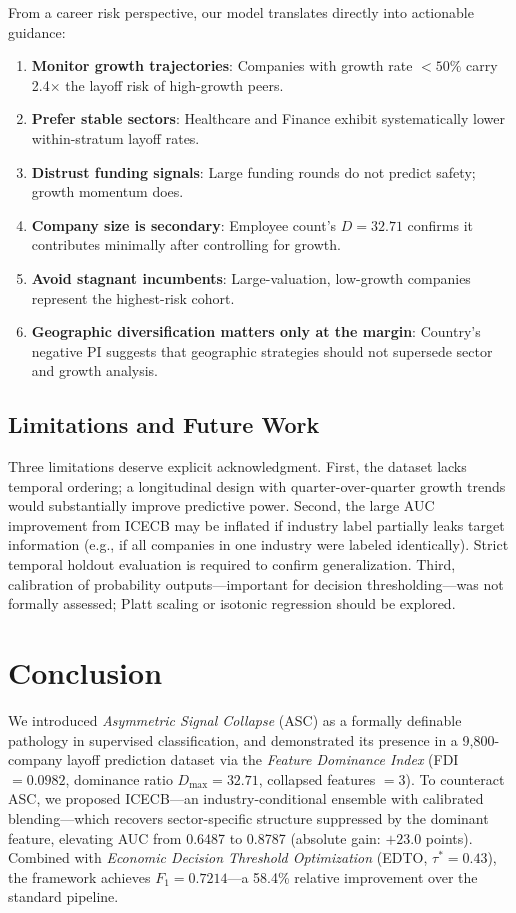 \documentclass[conference]{IEEEtran}
\begin{document}
From a career risk perspective, our model translates directly into actionable guidance:
\begin{enumerate}
\item \textbf{Monitor growth trajectories}: Companies with growth rate $< 50\%$ carry 2.4$\times$ the layoff risk of high-growth peers.
\item \textbf{Prefer stable sectors}: Healthcare and Finance exhibit systematically lower within-stratum layoff rates.
\item \textbf{Distrust funding signals}: Large funding rounds do not predict safety; growth momentum does.
\item \textbf{Company size is secondary}: Employee count's $D = 32.71$ confirms it contributes minimally after controlling for growth.
\item \textbf{Avoid stagnant incumbents}: Large-valuation, low-growth companies represent the highest-risk cohort.
\item \textbf{Geographic diversification matters only at the margin}: Country's negative PI suggests that geographic strategies should not supersede sector and growth analysis.
\end{enumerate}

\subsection{Limitations and Future Work}

Three limitations deserve explicit acknowledgment. First, the dataset lacks temporal ordering; a longitudinal design with quarter-over-quarter growth trends would substantially improve predictive power. Second, the large AUC improvement from ICECB may be inflated if industry label partially leaks target information (e.g., if all companies in one industry were labeled identically). Strict temporal holdout evaluation is required to confirm generalization. Third, calibration of probability outputs---important for decision thresholding---was not formally assessed; Platt scaling or isotonic regression should be explored.

\section{Conclusion}
\label{sec:conclusion}

We introduced \textit{Asymmetric Signal Collapse} (ASC) as a formally definable pathology in supervised classification, and demonstrated its presence in a 9,800-company layoff prediction dataset via the \textit{Feature Dominance Index} (FDI $= 0.0982$, dominance ratio $D_{\max} = 32.71$, collapsed features $= 3$). To counteract ASC, we proposed ICECB---an industry-conditional ensemble with calibrated blending---which recovers sector-specific structure suppressed by the dominant feature, elevating AUC from 0.6487 to 0.8787 (absolute gain: $+23.0$ points). Combined with \textit{Economic Decision Threshold Optimization} (EDTO, $\tau^* = 0.43$), the framework achieves $F_1 = 0.7214$---a 58.4\% relative improvement over the standard pipeline.
\end{document}
